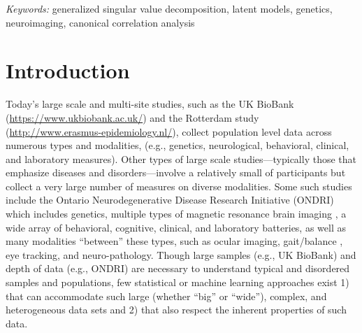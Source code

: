 \documentclass[12pt]{article}
\begin{document}
\noindent%
{\it Keywords:} generalized singular value decomposition, latent models, genetics, neuroimaging, canonical correlation analysis
\vfill

\newpage
{} %

\hypertarget{introduction}{%
\section{Introduction}\label{introduction}}

\label{section:Intro}

Today's large scale and multi-site studies, such as the UK BioBank
(\url{https://www.ukbiobank.ac.uk/}) and the Rotterdam study
(\url{http://www.erasmus-epidemiology.nl/}), collect population level
data across numerous types and modalities, (e.g., genetics,
neurological, behavioral, clinical, and laboratory measures). Other
types of large scale studies---typically those that emphasize diseases
and disorders---involve a relatively small of participants but collect a
very large number of measures on diverse modalities. Some such studies
include the Ontario Neurodegenerative Disease Research Initiative
(ONDRI) \citep{farhan_ontario_2016} which includes genetics, multiple
types of magnetic resonance brain imaging
\citep{duchesne_canadian_2019}, a wide array of behavioral, cognitive,
clinical, and laboratory batteries, as well as many modalities
``between'' these types, such as ocular imaging, gait/balance
\citep{montero-odasso_motor_2017-1}, eye tracking, and neuro-pathology.
Though large samples (e.g., UK BioBank) and depth of data (e.g., ONDRI)
are necessary to understand typical and disordered samples and
populations, few statistical or machine learning approaches exist 1)
that can accommodate such large (whether ``big'' or ``wide''), complex,
and heterogeneous data sets and 2) that also respect the inherent
properties of such data.
\end{document}
